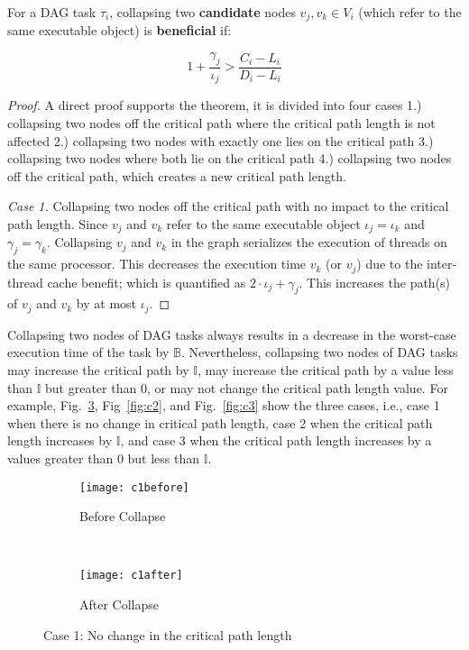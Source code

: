 \begin{theorem}\label{thrm:conditional-collapse} For a DAG task ${\tau_i}$, collapsing two \textbf{candidate} nodes ${v_j, v_k \in V_i}$ (which refer to the same executable object) is \textbf{beneficial} if:

    \begin{equation}\label{eq:cond}
        1 + \frac{\gamma_j}{\iota_j} > \frac{C_i  - L_i }{D_i - L_i}
    \end{equation}
\end{theorem}
\begin{proof}
A direct proof supports the theorem, it is divided into four cases 1.) collapsing two nodes off the critical path where the critical path length is not affected 2.) collapsing two nodes with exactly one lies on the critical path 3.) collapsing two nodes where both lie on the critical path 4.) collapsing two nodes off the critical path, which creates a new critical path length.

\emph{Case 1.} Collapsing two nodes off the critical path with no impact to the critical path length. Since ${v_j}$ and ${v_k}$ refer to the same executable object ${\iota_j = \iota_k}$ and ${\gamma_j = \gamma_k}$. Collapsing ${v_j}$ and ${v_k}$ in the graph serializes the execution of threads on the same processor. This decreases the execution time ${v_k}$ (or ${v_j}$) due to the inter-thread cache benefit; which is quantified as ${2 \cdot \iota_j + \gamma_j}$. This increases the path(s) of ${v_j}$ and ${v_k}$ by at most ${\iota_j}$. 
\end{proof}

Collapsing two nodes of DAG tasks always results in a decrease in the worst-case execution time of the task by $\mathbb{B}$. Nevertheless, collapsing two nodes of DAG tasks may increase the critical path by $\mathbb{I}$, may increase the critical path by a value less than $\mathbb{I}$ but greater than $0$, or may not change the critical path length value. For example, Fig.~\ref{fig:c1}, Fig~\ref{fig:c2}, and Fig.~\ref{fig:c3} show the three cases, i.e., case 1 when there is no change in critical path length, case 2 when the critical path length increases by $\mathbb{I}$, and case 3 when the critical path length increases by a values greater than $0$ but less than $\mathbb{I}$.

\begin{figure}
  \centering
  \begin{subfigure}[b]{0.4\textwidth}{
      \texttt{[image: c1before]}
      \caption{Before Collapse}
      \label{fig:c1before}
    }
  \end{subfigure}~
  \begin{subfigure}[b]{0.4\textwidth}{
      \texttt{[image: c1after]}
      \caption{After Collapse}
      \label{fig:c1after}
    }
  \end{subfigure}
  \caption{Case 1:  No change in the critical path length}
  \label{fig:c1}
\end{figure}

